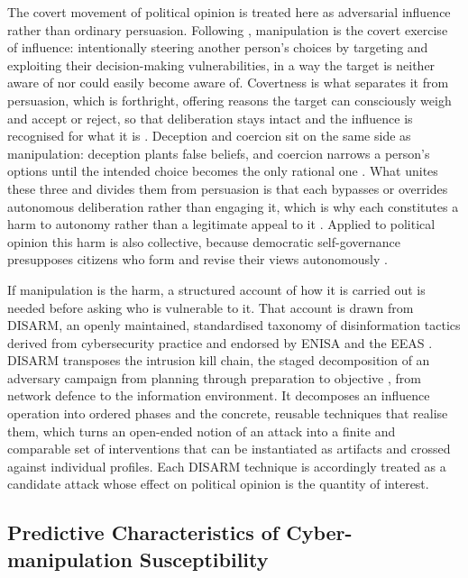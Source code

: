 \documentclass[11pt,a4paper]{article}
\begin{document}
The covert movement of political opinion is treated here as adversarial influence rather
than ordinary persuasion. Following \citet{susser2019technology}, manipulation is the
covert exercise of influence: intentionally steering another person's choices by
targeting and exploiting their decision-making vulnerabilities, in a way the target is
neither aware of nor could easily become aware of. Covertness is what separates it from
persuasion, which is forthright, offering reasons the target can consciously weigh and
accept or reject, so that deliberation stays intact and the influence is recognised for
what it is \citep{botes2023autonomy,sheikh2023persuasion}. Deception and coercion sit on
the same side as manipulation: deception plants false beliefs, and coercion narrows a
person's options until the intended choice becomes the only rational one
\citep{botes2023autonomy}. What unites these three and divides them from persuasion is
that each bypasses or overrides autonomous deliberation rather than engaging it, which is
why each constitutes a harm to autonomy rather than a legitimate appeal to it
\citep{botes2023autonomy,susser2019technology}. Applied to political opinion this harm is
also collective, because democratic self-governance presupposes citizens who form and
revise their views autonomously \citep{susser2019technology}.

If manipulation is the harm, a structured account of how it is carried out is needed
before asking who is vulnerable to it. That account is drawn from DISARM, an openly
maintained, standardised taxonomy of disinformation tactics derived from cybersecurity
practice and endorsed by ENISA and the EEAS \citep{disarmfoundationnd,enisaeeas2022fimi}.
DISARM transposes the intrusion kill chain, the staged decomposition of an adversary
campaign from planning through preparation to objective \citep{hutchins2011intelligence},
from network defence to the information environment. It decomposes an influence operation
into ordered phases and the concrete, reusable techniques that realise them, which turns
an open-ended notion of an attack into a finite and comparable set of interventions that
can be instantiated as artifacts and crossed against individual profiles. Each DISARM
technique is accordingly treated as a candidate attack whose effect on political opinion
is the quantity of interest.

\subsection{Predictive Characteristics of Cyber-manipulation Susceptibility}
\end{document}
